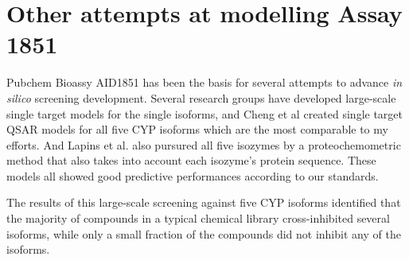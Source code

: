 



\section{Other attempts at modelling Assay 1851}
Pubchem Bioassy AID1851 has been the basis for several attempts to advance \textit{in silico} screening development. Several research groups have developed large-scale single target models for the single isoforms, \cite{Vasanthanathan2012, Novotarskyi2012} and Cheng et al created single target QSAR models for all five CYP isoforms which are the most comparable to my efforts. \cite{Cheng2011} And Lapins et al. also pursured all five isozymes by a proteochemometric method that also takes into account each isozyme's protein sequence. \cite{Lapins2013} These models all showed good predictive performances according to our standards.


The results of this large-scale screening against five CYP isoforms identified that the majority of compounds in a typical chemical library cross-inhibited several isoforms, while only a small fraction of the compounds did not inhibit any of the isoforms. \cite{Veith2009}


